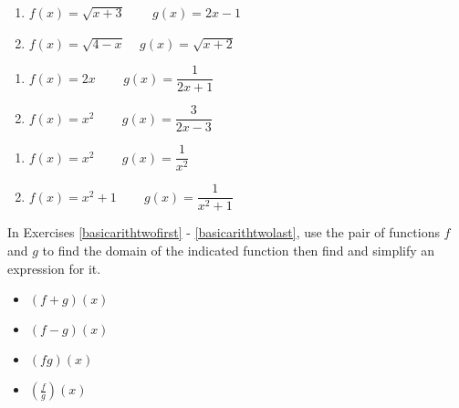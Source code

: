 \begin{multicols}{2}
\begin{enumerate}
\setcounter{enumi}{\value{HW}}

\item  $f(x) = \sqrt{x+3}$ ~~~  $g(x) = 2x-1$
\item  $f(x) = \sqrt{4-x}$ ~ $g(x) = \sqrt{x+2}$

\setcounter{HW}{\value{enumi}}
\end{enumerate}
\end{multicols}

\begin{multicols}{2}
\begin{enumerate}
\setcounter{enumi}{\value{HW}}

\item  $f(x) = 2x$ ~~~  $g(x) = \dfrac{1}{2x+1}$
\item  $f(x) = x^2$ ~~~ $g(x) = \dfrac{3}{2x-3}$

\setcounter{HW}{\value{enumi}}
\end{enumerate}
\end{multicols}

\begin{multicols}{2}
\begin{enumerate}
\setcounter{enumi}{\value{HW}}

\item  $f(x) = x^2$ ~~~  $g(x) = \dfrac{1}{x^2}$
\item  $f(x) = x^2+1$ ~~~ $g(x) = \dfrac{1}{x^2+1}$ \label{basicarithonelast}

\setcounter{HW}{\value{enumi}}
\end{enumerate}
\end{multicols}

In Exercises \ref{basicarithtwofirst} - \ref{basicarithtwolast}, use the pair of functions $f$ and $g$ to find the domain of the indicated function then find and simplify an expression for it.

\begin{multicols}{4}
\begin{itemize}

\item  $(f+g)(x)$
\item  $(f-g)(x)$
\item  $(fg)(x)$
\item  $\left(\frac{f}{g}\right)(x)$

\end{itemize}
\end{multicols}

